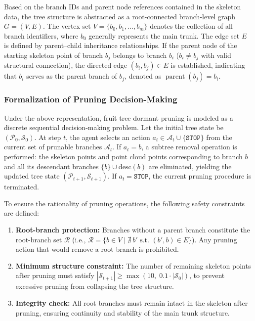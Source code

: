 \documentclass[12pt,a4paper,fontset=fandol]{ctexart}
\begin{document}
Based on the branch IDs and parent node references contained in the skeleton data, the tree structure is abstracted as a root-connected branch-level graph  $G = (V, E)$.
 The vertex set $V = \{b_0, b_1, \ldots, b_m\}$ denotes the collection of all branch identifiers, where $b_0$  generally represents the main trunk. 
 The edge set $E$ is defined by parent--child inheritance relationships. If the parent node of the starting skeleton point of branch $b_j$ belongs to branch $b_i$ ($b_i \neq b_j$ with valid structural connection), the directed edge $(b_i, b_j) \in E$ is established, 
 indicating that $b_i$ serves as the parent branch of $b_j$, denoted as $\operatorname{parent}(b_j) = b_i$.

\subsubsection{ Formalization of Pruning Decision-Making}

Under the above representation, fruit tree dormant pruning is modeled as a discrete sequential decision-making problem. Let the initial tree state be $(\mathcal{P}_0, \mathcal{S}_0)$. At step $t$, the agent selects an action $a_t \in \mathcal{A}_t \cup \{\texttt{STOP}\}$ from the current set of prunable branches $\mathcal{A}_t$.
If $a_t = b$,
a subtree removal operation is performed: the skeleton points and point cloud points corresponding to branch $b$ and all its descendant branches $\{b\} \cup \mathrm{desc}(b)$ are eliminated,
yielding the updated tree state $(\mathcal{P}_{t+1}, \mathcal{S}_{t+1})$.
If $a_t = \texttt{STOP}$, the current pruning procedure is terminated.

To ensure the rationality of pruning operations, the following safety constraints are defined:
\begin{enumerate}[label=(\roman*), leftmargin=2em]
  \item \textbf{Root-branch protection:}
        Branches without a parent branch constitute the root-branch set $\mathcal{R}$
        (i.e., $\mathcal{R} = \{b \in V \mid \nexists\, b' \text{ s.t. } (b', b) \in E\}$).
        Any pruning action that would remove a root branch is prohibited.
  \item \textbf{Minimum structure constraint:}
        The number of remaining skeleton points after pruning must satisfy
        $|\mathcal{S}_{t+1}| \geq \max(10,\; 0.1 \cdot |\mathcal{S}_0|)$,
        to prevent excessive pruning from collapsing the tree structure.
  \item \textbf{Integrity check:}
        All root branches must remain intact in the skeleton after pruning,
        ensuring continuity and stability of the main trunk structure.
\end{enumerate}
\end{document}

